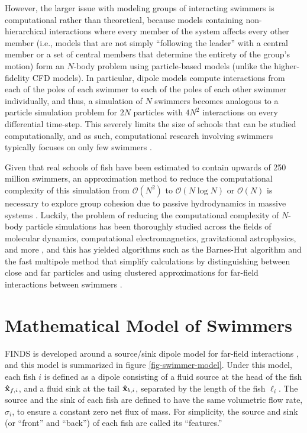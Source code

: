 \documentclass[letterpaper, 10pt, twoside]{LTJournalArticle}
\renewcommand{\O}{\mathcal{O}}
\begin{document}
However, the larger issue with modeling groups of interacting swimmers is
computational rather than theoretical, because models containing
non-hierarchical interactions where every member of the system affects every
other member (i.e., models that are not simply ``following the leader'' with
a central member or a set of central members that determine the entirety of the
group's motion) form an $N$-body problem using particle-based models (unlike the
higher-fidelity CFD models). In particular, dipole models compute
interactions from each of the poles of each swimmer to each of the poles of each
other swimmer individually, and thus, a simulation of $N$ swimmers becomes
analogous to a particle simulation problem for $2N$ particles with $4N^2$
interactions on every differential time-step. This severely limits the size of
schools that can be studied computationally, and as such, computational research
involving swimmers typically focuses on only few swimmers
\cite{ligman_lund_furth_2024}.

Given that real schools of fish have been estimated to contain upwards of 250
million swimmers, an approximation method to reduce the computational complexity
of this simulation from $\O(N^2)$ to $\O(N \log N)$ or $\O(N)$ is necessary to
explore group cohesion due to passive hydrodynamics in massive systems
\cite{yong_2009}. Luckily, the problem of reducing the computational complexity
of $N$-body particle simulations has been thoroughly studied across the
fields of molecular dynamics, computational electromagnetics, gravitational
astrophysics, and more \cite{grama_2011}, and this has yielded algorithms
such as the Barnes-Hut algorithm and the fast multipole method that simplify
calculations by distinguishing between close and far particles and using
clustered approximations for far-field interactions between swimmers
\cite{grama_2011, barnes_hut_1986, greengard_rokhlin_1987}.

\section{Mathematical Model of Swimmers}

FINDS is developed around a source/sink dipole model for far-field interactions \cite{mabrouk_floryan_2024, mabrouk_floryan_2025}, and this model is summarized
in figure \ref{fig-swimmer-model}. Under this model, each fish $i$ is defined as
a dipole consisting of a fluid source at the head of the fish $\vu{x}_{f,i}$, and
a fluid sink at the tail $\vu{x}_{b,i}$, separated by the length of the fish
$\ell_i$. The source and the sink of each fish are defined to have the same
volumetric flow rate, $\sigma_i$, to ensure a constant zero net flux of mass.
For simplicity, the source and sink (or ``front'' and ``back'') of each fish are
called its ``features.''
\end{document}
